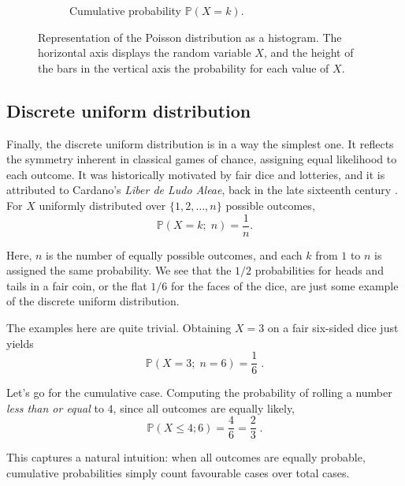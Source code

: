\documentclass{book}
\begin{document}
\begin{figure}[ht]
\begin{subfigure}[b]{0.48\textwidth}
        \caption{Cumulative probability $\mathbb{P} (X = k)$.}
        \label{fig:poisson1_cum}
    \end{subfigure}
    \caption{Representation of the Poisson distribution as a histogram. The horizontal axis displays the random variable $X$, and the height of the bars in the vertical axis the probability for each value of $X$.}
    \label{fig:poisson_comparison}
\end{figure}

\subsection*{Discrete uniform distribution}

Finally, the discrete uniform distribution is in a way the simplest one. It reflects the symmetry inherent in classical games of chance, assigning equal likelihood to each outcome. It was historically motivated by fair dice and lotteries, and it is attributed to Cardano's \textit{Liber de Ludo Aleae}, back in the late sixteenth century \cite{cardano-ludo}. For $X$ uniformly distributed over $\{1, 2, \dots, n\}$ possible outcomes,
\begin{equation}
	\mathbb{P}(X = k; \; n) = \frac{1}{n}.
	\label{eq:discrete_uniform}
\end{equation}

Here, $n$ is the number of equally possible outcomes, and each $k$ from $1$ to $n$ is assigned the same probability. We see that the $1/2$ probabilities for heads and tails in a fair coin, or the flat $1/6$ for the faces of the dice, are just some example of the discrete uniform distribution.

\medskip

The examples here are quite trivial. Obtaining $X = 3$ on a fair six-sided dice just yields
\begin{equation}
	\mathbb{P}(X = 3; \; n = 6) = \frac{1}{6} \; . \nonumber
\end{equation}

\medskip

Let's go for the cumulative case. Computing the probability of rolling a number \textit{less than or equal} to $4$, since all outcomes are equally likely, 
\begin{equation}
	\mathbb{P}(X \leq 4; 6) = \frac{4}{6} = \frac{2}{3} \; . \nonumber
\end{equation}

This captures a natural intuition: when all outcomes are equally probable, cumulative probabilities simply count favourable cases over total cases.
\end{document}
